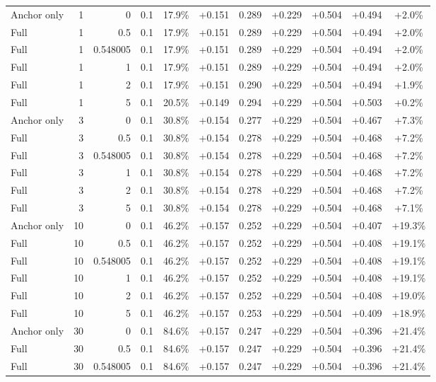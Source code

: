 \begin{table}[htbp]
\begin{tabular}{lrrrccccccc}
Anchor only & 1 & 0 & 0.1 & 17.9\% & +0.151 & 0.289 & +0.229 & +0.504 & +0.494 & +2.0\% \\
Full & 1 & 0.5 & 0.1 & 17.9\% & +0.151 & 0.289 & +0.229 & +0.504 & +0.494 & +2.0\% \\
Full & 1 & 0.548005 & 0.1 & 17.9\% & +0.151 & 0.289 & +0.229 & +0.504 & +0.494 & +2.0\% \\
Full & 1 & 1 & 0.1 & 17.9\% & +0.151 & 0.289 & +0.229 & +0.504 & +0.494 & +2.0\% \\
Full & 1 & 2 & 0.1 & 17.9\% & +0.151 & 0.290 & +0.229 & +0.504 & +0.494 & +1.9\% \\
Full & 1 & 5 & 0.1 & 20.5\% & +0.149 & 0.294 & +0.229 & +0.504 & +0.503 & +0.2\% \\
Anchor only & 3 & 0 & 0.1 & 30.8\% & +0.154 & 0.277 & +0.229 & +0.504 & +0.467 & +7.3\% \\
Full & 3 & 0.5 & 0.1 & 30.8\% & +0.154 & 0.278 & +0.229 & +0.504 & +0.468 & +7.2\% \\
Full & 3 & 0.548005 & 0.1 & 30.8\% & +0.154 & 0.278 & +0.229 & +0.504 & +0.468 & +7.2\% \\
Full & 3 & 1 & 0.1 & 30.8\% & +0.154 & 0.278 & +0.229 & +0.504 & +0.468 & +7.2\% \\
Full & 3 & 2 & 0.1 & 30.8\% & +0.154 & 0.278 & +0.229 & +0.504 & +0.468 & +7.2\% \\
Full & 3 & 5 & 0.1 & 30.8\% & +0.154 & 0.278 & +0.229 & +0.504 & +0.468 & +7.1\% \\
Anchor only & 10 & 0 & 0.1 & 46.2\% & +0.157 & 0.252 & +0.229 & +0.504 & +0.407 & +19.3\% \\
Full & 10 & 0.5 & 0.1 & 46.2\% & +0.157 & 0.252 & +0.229 & +0.504 & +0.408 & +19.1\% \\
Full & 10 & 0.548005 & 0.1 & 46.2\% & +0.157 & 0.252 & +0.229 & +0.504 & +0.408 & +19.1\% \\
Full & 10 & 1 & 0.1 & 46.2\% & +0.157 & 0.252 & +0.229 & +0.504 & +0.408 & +19.1\% \\
Full & 10 & 2 & 0.1 & 46.2\% & +0.157 & 0.252 & +0.229 & +0.504 & +0.408 & +19.0\% \\
Full & 10 & 5 & 0.1 & 46.2\% & +0.157 & 0.253 & +0.229 & +0.504 & +0.409 & +18.9\% \\
Anchor only & 30 & 0 & 0.1 & 84.6\% & +0.157 & 0.247 & +0.229 & +0.504 & +0.396 & +21.4\% \\
Full & 30 & 0.5 & 0.1 & 84.6\% & +0.157 & 0.247 & +0.229 & +0.504 & +0.396 & +21.4\% \\
Full & 30 & 0.548005 & 0.1 & 84.6\% & +0.157 & 0.247 & +0.229 & +0.504 & +0.396 & +21.4\% \\

\end{tabular}
\end{table}
